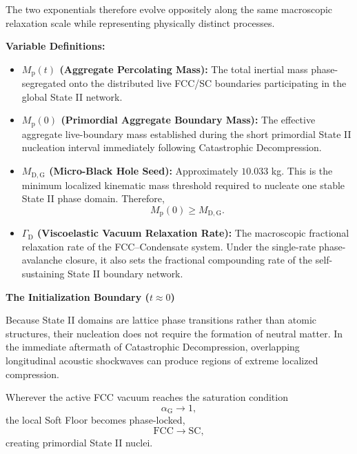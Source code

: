 The two exponentials therefore evolve oppositely along the same macroscopic relaxation scale while representing physically distinct processes.

\textbf{Variable Definitions:}

\begin{itemize}

    \item \textbf{$M_{\mathrm{p}}(t)$ (Aggregate Percolating Mass):} The total inertial mass phase-segregated onto the distributed live FCC/SC boundaries participating in the global State II network.

    \item \textbf{$M_{\mathrm{p}}(0)$ (Primordial Aggregate Boundary Mass):} The effective aggregate live-boundary mass established during the short primordial State II nucleation interval immediately following Catastrophic Decompression.

    \item \textbf{$M_{\mathrm{D,G}}$ (Micro-Black Hole Seed):} Approximately $10.033$ kg. This is the minimum localized kinematic mass threshold required to nucleate one stable State II phase domain. Therefore,
    \begin{equation}
        M_{\mathrm{p}}(0)
        \geq
        M_{\mathrm{D,G}}.
    \end{equation}

    \item \textbf{$\Gamma_{\mathrm{D}}$ (Viscoelastic Vacuum Relaxation Rate):} The macroscopic fractional relaxation rate of the FCC--Condensate system. Under the single-rate phase-avalanche closure, it also sets the fractional compounding rate of the self-sustaining State II boundary network.

\end{itemize}

\textbf{The Initialization Boundary ($t\approx0$)}

Because State II domains are lattice phase transitions rather than atomic structures, their nucleation does not require the formation of neutral matter. In the immediate aftermath of Catastrophic Decompression, overlapping longitudinal acoustic shockwaves can produce regions of extreme localized compression.

Wherever the active FCC vacuum reaches the saturation condition
\begin{equation}
    \alpha_{\mathrm{G}}
    \rightarrow
    1,
\end{equation}
the local Soft Floor becomes phase-locked,
\begin{equation}
    \mathrm{FCC}
    \rightarrow
    \mathrm{SC},
\end{equation}
creating primordial State II nuclei.

